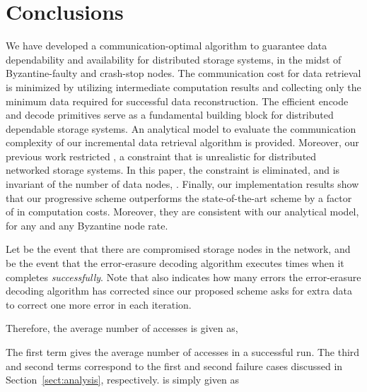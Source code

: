 \documentclass[10pt,journal,letterpaper,compsoc]{IEEEtran}
\newcommand{\0}{{\bf 0}}
\begin{document}
\section{Conclusions}
\label{sect:conc}
\vspace{-0.25em}
We have developed a communication-optimal algorithm to guarantee data dependability 
and availability for distributed storage systems, in the midst of Byzantine-faulty and crash-stop nodes.
The communication cost for data retrieval is minimized by utilizing intermediate computation 
results and collecting only the minimum data required 
for successful data reconstruction. The efficient encode and decode
primitives serve as a fundamental building block for distributed dependable
storage systems. An analytical model to evaluate the communication complexity of our incremental data retrieval algorithm is provided.
Moreover, our previous work restricted 
, a constraint that is unrealistic for distributed networked storage systems. In this paper, the constraint is eliminated, and 
 is invariant of the number of data nodes, . Finally, our implementation
results show that our progressive scheme outperforms the state-of-the-art scheme by a factor of  in computation costs.
Moreover, they are consistent with our analytical model, for any  and any
Byzantine node rate.
\begin{comment}
The proposed scheme guarantees latency of real time applications by collecting data in each data retrieval, according to the probability that a storage node is Byzantine. Our scheme is desirable for real-time systems, where energy minimization in communication is critical. Our scheme is also desirable under high data rates as it minimizes communication costs by retrieving only necessary symbols. 
\end{comment}
\label{app:proof}
Let  be the event that there are  compromised
storage nodes in the network, and  be the event that the error-erasure
decoding algorithm  executes  times when it completes {\it successfully}.
Note that  also indicates how many errors the error-erasure decoding
algorithm has corrected since our proposed scheme asks for extra data to
correct one more error in each iteration.  

Therefore, the average number of accesses
is given as,

The first term gives the average number of accesses  in a  successful run. The third and second  terms
correspond to the first and second failure cases discussed in Section~\ref{sect:analysis}, respectively.  
is simply given as 
\end{document}
